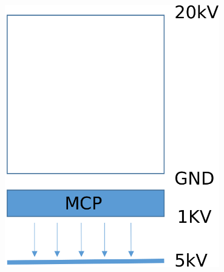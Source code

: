 \begin{frame}[t]
\begin{columns}[T]
\begin{column}{0.45\textwidth}
      \includegraphics[width=0.7\textwidth]{06_Backup/fig/fig000_ASYM}
    \end{column}
  \end{columns}
\end{frame}

